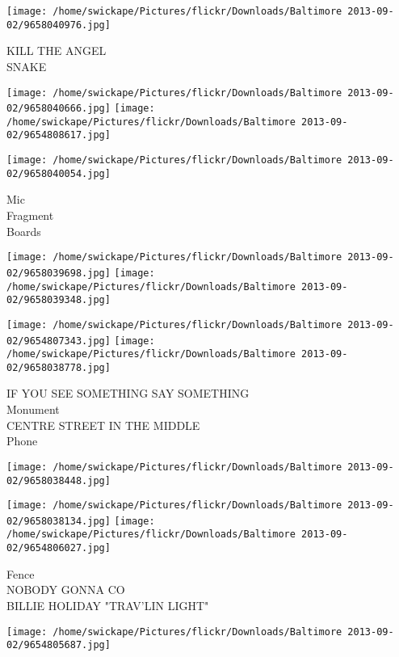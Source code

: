 \documentclass[10pt,letterpaper]{article}
\begin{document}
\vspace{0.25in}
\texttt{[image: /home/swickape/Pictures/flickr/Downloads/Baltimore 2013-09-02/9658040976.jpg]}

KILL THE ANGEL\\
SNAKE\\
\pagebreak

\texttt{[image: /home/swickape/Pictures/flickr/Downloads/Baltimore 2013-09-02/9658040666.jpg]}
\texttt{[image: /home/swickape/Pictures/flickr/Downloads/Baltimore 2013-09-02/9654808617.jpg]}

\vspace{0.25in}
\texttt{[image: /home/swickape/Pictures/flickr/Downloads/Baltimore 2013-09-02/9658040054.jpg]}

Mic\\
Fragment\\
Boards\\
\pagebreak

\texttt{[image: /home/swickape/Pictures/flickr/Downloads/Baltimore 2013-09-02/9658039698.jpg]}
\texttt{[image: /home/swickape/Pictures/flickr/Downloads/Baltimore 2013-09-02/9658039348.jpg]}

\texttt{[image: /home/swickape/Pictures/flickr/Downloads/Baltimore 2013-09-02/9654807343.jpg]}
\texttt{[image: /home/swickape/Pictures/flickr/Downloads/Baltimore 2013-09-02/9658038778.jpg]}

IF YOU SEE SOMETHING SAY SOMETHING\\
Monument\\
CENTRE STREET IN THE MIDDLE\\
Phone\\
\pagebreak

\texttt{[image: /home/swickape/Pictures/flickr/Downloads/Baltimore 2013-09-02/9658038448.jpg]}

\vspace{0.25in}
\texttt{[image: /home/swickape/Pictures/flickr/Downloads/Baltimore 2013-09-02/9658038134.jpg]}
\texttt{[image: /home/swickape/Pictures/flickr/Downloads/Baltimore 2013-09-02/9654806027.jpg]}

Fence\\
NOBODY GONNA CO\\
BILLIE HOLIDAY "TRAV'LIN LIGHT"\\
\pagebreak

\texttt{[image: /home/swickape/Pictures/flickr/Downloads/Baltimore 2013-09-02/9654805687.jpg]}
\end{document}
